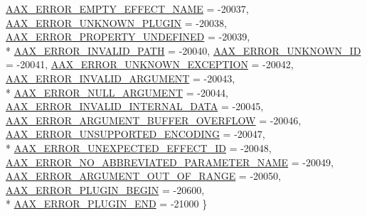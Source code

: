 \begin{DoxyCompactItemize}
\hyperlink{a00207_a5f8c7439f3a706c4f8315a9609811937a4fed1b5fbe03c5da6a8131fdf9dc632c}{A\+A\+X\+\_\+\+E\+R\+R\+O\+R\+\_\+\+E\+M\+P\+T\+Y\+\_\+\+E\+F\+F\+E\+C\+T\+\_\+\+N\+A\+M\+E} = -\/20037, 
\hyperlink{a00207_a5f8c7439f3a706c4f8315a9609811937a82f242cc5fd62a4bf7db13326eee77fb}{A\+A\+X\+\_\+\+E\+R\+R\+O\+R\+\_\+\+U\+N\+K\+N\+O\+W\+N\+\_\+\+P\+L\+U\+G\+I\+N} = -\/20038, 
\hyperlink{a00207_a5f8c7439f3a706c4f8315a9609811937aa94e856c17c3faf72f62806059e14013}{A\+A\+X\+\_\+\+E\+R\+R\+O\+R\+\_\+\+P\+R\+O\+P\+E\+R\+T\+Y\+\_\+\+U\+N\+D\+E\+F\+I\+N\+E\+D} = -\/20039, 
\\*
\hyperlink{a00207_a5f8c7439f3a706c4f8315a9609811937a5a9bd9a16c6c92b9ac39e16c3fed5711}{A\+A\+X\+\_\+\+E\+R\+R\+O\+R\+\_\+\+I\+N\+V\+A\+L\+I\+D\+\_\+\+P\+A\+T\+H} = -\/20040, 
\hyperlink{a00207_a5f8c7439f3a706c4f8315a9609811937ae754797bbf6271fbdc9e42de138dd067}{A\+A\+X\+\_\+\+E\+R\+R\+O\+R\+\_\+\+U\+N\+K\+N\+O\+W\+N\+\_\+\+I\+D} = -\/20041, 
\hyperlink{a00207_a5f8c7439f3a706c4f8315a9609811937a48a5ec1530ce351b081413c73097928f}{A\+A\+X\+\_\+\+E\+R\+R\+O\+R\+\_\+\+U\+N\+K\+N\+O\+W\+N\+\_\+\+E\+X\+C\+E\+P\+T\+I\+O\+N} = -\/20042, 
\hyperlink{a00207_a5f8c7439f3a706c4f8315a9609811937a7d27a3bd88231e331c98d85f5b10e2eb}{A\+A\+X\+\_\+\+E\+R\+R\+O\+R\+\_\+\+I\+N\+V\+A\+L\+I\+D\+\_\+\+A\+R\+G\+U\+M\+E\+N\+T} = -\/20043, 
\\*
\hyperlink{a00207_a5f8c7439f3a706c4f8315a9609811937aa77cf0ad2d545c97b095d8bc19a7c969}{A\+A\+X\+\_\+\+E\+R\+R\+O\+R\+\_\+\+N\+U\+L\+L\+\_\+\+A\+R\+G\+U\+M\+E\+N\+T} = -\/20044, 
\hyperlink{a00207_a5f8c7439f3a706c4f8315a9609811937af004b994cae4158400c2ff36e1a12004}{A\+A\+X\+\_\+\+E\+R\+R\+O\+R\+\_\+\+I\+N\+V\+A\+L\+I\+D\+\_\+\+I\+N\+T\+E\+R\+N\+A\+L\+\_\+\+D\+A\+T\+A} = -\/20045, 
\hyperlink{a00207_a5f8c7439f3a706c4f8315a9609811937af9fc41c647e2c9959ed6ebb45191be52}{A\+A\+X\+\_\+\+E\+R\+R\+O\+R\+\_\+\+A\+R\+G\+U\+M\+E\+N\+T\+\_\+\+B\+U\+F\+F\+E\+R\+\_\+\+O\+V\+E\+R\+F\+L\+O\+W} = -\/20046, 
\hyperlink{a00207_a5f8c7439f3a706c4f8315a9609811937a17a1fd40c029a9337ede3bad778eab3b}{A\+A\+X\+\_\+\+E\+R\+R\+O\+R\+\_\+\+U\+N\+S\+U\+P\+P\+O\+R\+T\+E\+D\+\_\+\+E\+N\+C\+O\+D\+I\+N\+G} = -\/20047, 
\\*
\hyperlink{a00207_a5f8c7439f3a706c4f8315a9609811937a81bfb2ecc085f4be343d78aea4b1116d}{A\+A\+X\+\_\+\+E\+R\+R\+O\+R\+\_\+\+U\+N\+E\+X\+P\+E\+C\+T\+E\+D\+\_\+\+E\+F\+F\+E\+C\+T\+\_\+\+I\+D} = -\/20048, 
\hyperlink{a00207_a5f8c7439f3a706c4f8315a9609811937ab7383b0169f6dfa5f86b1fefd6c58ae2}{A\+A\+X\+\_\+\+E\+R\+R\+O\+R\+\_\+\+N\+O\+\_\+\+A\+B\+B\+R\+E\+V\+I\+A\+T\+E\+D\+\_\+\+P\+A\+R\+A\+M\+E\+T\+E\+R\+\_\+\+N\+A\+M\+E} = -\/20049, 
\hyperlink{a00207_a5f8c7439f3a706c4f8315a9609811937a8dd2fdd469583a046765eae9178678a3}{A\+A\+X\+\_\+\+E\+R\+R\+O\+R\+\_\+\+A\+R\+G\+U\+M\+E\+N\+T\+\_\+\+O\+U\+T\+\_\+\+O\+F\+\_\+\+R\+A\+N\+G\+E} = -\/20050, 
\hyperlink{a00207_a5f8c7439f3a706c4f8315a9609811937a71083c68ddd0e16973ba85383727ef9e}{A\+A\+X\+\_\+\+E\+R\+R\+O\+R\+\_\+\+P\+L\+U\+G\+I\+N\+\_\+\+B\+E\+G\+I\+N} = -\/20600, 
\\*
\hyperlink{a00207_a5f8c7439f3a706c4f8315a9609811937a2bfce952f1b95322cf4748c115533658}{A\+A\+X\+\_\+\+E\+R\+R\+O\+R\+\_\+\+P\+L\+U\+G\+I\+N\+\_\+\+E\+N\+D} = -\/21000
 \}
\end{DoxyCompactItemize}
